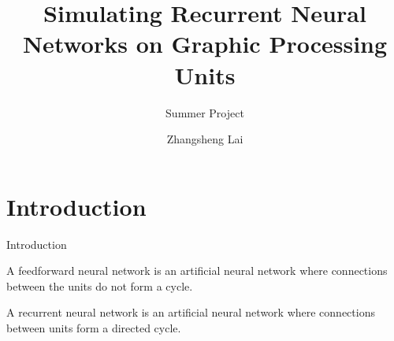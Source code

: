 \documentclass[10pt]{beamer}
\title{Simulating Recurrent Neural Networks on Graphic Processing Units}
\subtitle{Summer Project}
\author{Zhangsheng Lai}
\begin{document}
\begin{frame}
\titlepage
\end{frame}



\section{Introduction}

\begin{frame}{Introduction}
\begin{definition}
A \alert{feedforward neural network} is an artificial neural network where connections between the units do not form a cycle.
\end{definition}

\begin{definition}
A \alert{recurrent neural network} is an artificial neural network where connections between units form a directed cycle.
\end{definition}

\end{frame}
\end{document}
